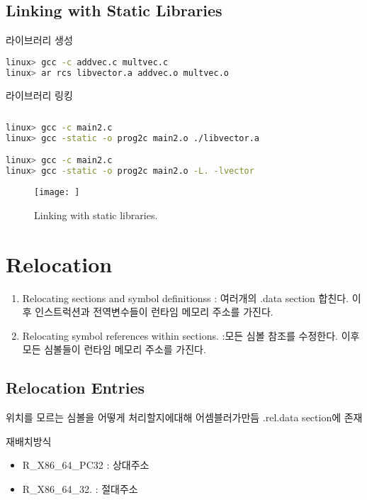 \subsection{Linking with Static Libraries}

라이브러리 생성

\begin{lstlisting}[language=bash]
linux> gcc -c addvec.c multvec.c
linux> ar rcs libvector.a addvec.o multvec.o
\end{lstlisting}

라이브러리 링킹

\begin{lstlisting}[language=bash]
    
linux> gcc -c main2.c
linux> gcc -static -o prog2c main2.o ./libvector.a

linux> gcc -c main2.c
linux> gcc -static -o prog2c main2.o -L. -lvector

\end{lstlisting}

\begin{figure}[h!]
    \centering
    \texttt{[image: ]}
    \caption{Linking with static libraries.}
\end{figure}




\section{Relocation}

\begin{enumerate}
    \item Relocating sections and symbol definitionss :  여러개의 .data section 합친다. 이후 인스트럭션과 전역변수들이 런타임 메모리 주소를 가진다.
    \item Relocating symbol references within sections. :모든 심볼 참조를 수정한다. 이후  
    모든 심볼들이 런타임 메모리 주소를 가진다.
\end{enumerate}

\subsection{Relocation Entries}
위치를 모르는 심볼을 어떻게 처리할지에대해 어셈블러가만듬
.rel.data section에 존재

재배치방식
\begin{itemize}
    \item R_X86_64_PC32 : 상대주소
    \item R_X86_64_32. : 절대주소
\end{itemize}

